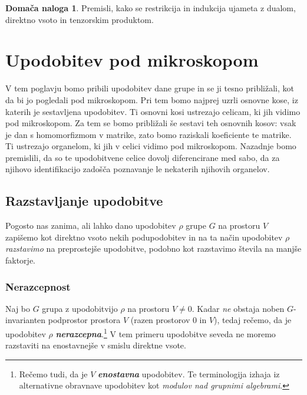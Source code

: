 \documentclass[11pt]{book}
\def\definicija{\color{rdeca}\bf\em}
\theoremstyle{definition}
\theoremstyle{zgled}
\theoremstyle{odprtproblem}
\theoremstyle{domacanaloga}
\newtheorem*{domacanaloga}{Domača naloga}
\theoremstyle{izrek}
\begin{document}
\begin{domacanaloga}
    Premisli, kako se restrikcija in indukcija ujameta z dualom, direktno vsoto in tenzorskim produktom.
\end{domacanaloga}

\chapter{Upodobitev pod mikroskopom}

V tem poglavju bomo pribili upodobitev dane grupe in se ji tesno približali, kot da bi jo pogledali pod mikroskopom. Pri tem bomo najprej uzrli osnovne kose, iz katerih je sestavljena upodobitev. Ti osnovni kosi ustrezajo celicam, ki jih vidimo pod mikroskopom. Za tem se bomo približali še sestavi teh osnovnih kosov: vsak je dan s homomorfizmom v matrike, zato bomo raziskali koeficiente te matrike. Ti ustrezajo organelom, ki jih v celici vidimo pod mikroskopom. Nazadnje bomo premislili, da so te upodobitvene celice dovolj diferencirane med sabo, da za njihovo identifikacijo zadošča poznavanje le nekaterih njihovih organelov.

\section{Razstavljanje upodobitve}

Pogosto nas zanima, ali lahko dano upodobitev $\rho$ grupe $G$ na prostoru $V$ zapišemo kot direktno vsoto nekih podupodobitev in na ta način upodobitev $\rho$ \emph{razstavimo} na preprostejše upodobitve, podobno kot razstavimo števila na manjše faktorje. 

\subsection{Nerazcepnost}

Naj bo $G$ grupa z upodobitvijo $\rho$ na prostoru $V \neq 0$. Kadar \emph{ne} obstaja noben $G$-invarianten podprostor prostora $V$ (razen prostorov $0$ in $V$), tedaj rečemo, da je upodobitev $\rho$ {\definicija nerazcepna}.\footnote{Rečemo tudi, da je $V$ {\definicija enostavna} upodobitev. Te terminologija izhaja iz alternativne obravnave upodobitev kot \emph{modulov nad grupnimi algebrami}.} V tem primeru upodobitve seveda ne moremo razstaviti na enostavnejše v smislu direktne vsote.
\end{document}
